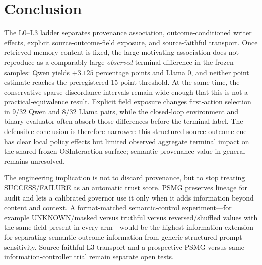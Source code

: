 \section{Conclusion}
The L0--L3 ladder separates provenance association, outcome-conditioned writer effects, explicit source-outcome-field exposure, and source-faithful transport. Once retrieved memory content is fixed, the large motivating association does not reproduce as a comparably large \emph{observed} terminal difference in the frozen samples: Qwen yields $+3.125$ percentage points and Llama $0$, and neither point estimate reaches the preregistered 15-point threshold. At the same time, the conservative sparse-discordance intervals remain wide enough that this is not a practical-equivalence result. Explicit field exposure changes first-action selection in 9/32 Qwen and 8/32 Llama pairs, while the closed-loop environment and binary evaluator often absorb those differences before the terminal label. The defensible conclusion is therefore narrower: this structured source-outcome cue has clear local policy effects but limited observed aggregate terminal impact on the shared frozen OSInteraction surface; semantic provenance value in general remains unresolved.

The engineering implication is not to discard provenance, but to stop treating SUCCESS/FAILURE as an automatic trust score. PSMG preserves lineage for audit and lets a calibrated governor use it only when it adds information beyond content and context. A format-matched semantic-control experiment---for example UNKNOWN/masked versus truthful versus reversed/shuffled values with the same field present in every arm---would be the highest-information extension for separating semantic outcome information from generic structured-prompt sensitivity. Source-faithful L3 transport and a prospective PSMG-versus-same-information-controller trial remain separate open tests.
